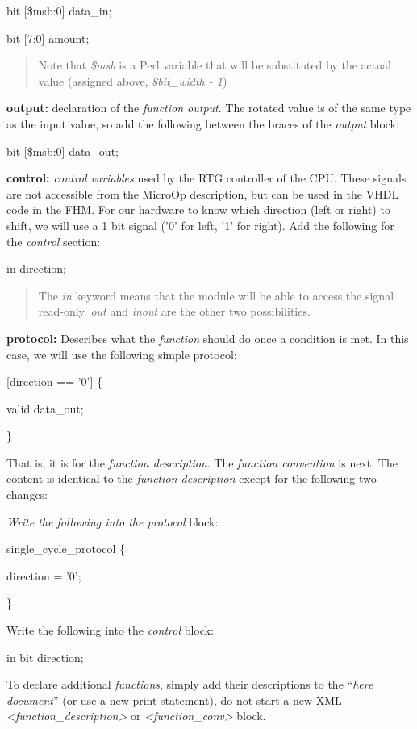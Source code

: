 \documentclass[
]{article}
\begin{document}
bit {[}\$msb:0{]} data\_in;

bit {[}7:0{]} amount;

\begin{quote}
Note that \emph{\$msb} is a Perl variable that will be substituted by
the actual value (assigned above, \emph{\$bit\_width - 1})
\end{quote}

\textbf{output:} declaration of the \emph{function output}. The rotated
value is of the same type as the input value, so add the following
between the braces of the \emph{output} block:

bit {[}\$msb:0{]} data\_out;

\textbf{control:} \emph{control variables} used by the RTG controller of
the CPU. These signals are not accessible from the MicroOp description,
but can be used in the VHDL code in the FHM. For our hardware to know
which direction (left or right) to shift, we will use a 1 bit signal
('0' for left, '1' for right). Add the following for the \emph{control}
section:

in direction;

\begin{quote}
The \emph{in} keyword means that the module will be able to access the
signal read-only. \emph{out} and \emph{inout} are the other two
possibilities.
\end{quote}

\textbf{protocol:} Describes what the \emph{function} should do once a
condition is met. In this case, we will use the following simple
protocol:

{[}direction == '0'{]} \{

valid data\_out;

\}

That is, it is for the \emph{function description}. The \emph{function
convention} is next. The content is identical to the \emph{function
description} except for the following two changes:

\emph{Write the following into the protocol} block:

single\_cycle\_protocol \{

direction = '0';

\}

Write the following into the \emph{control} block:

in bit direction;

To declare additional \emph{functions}, simply add their descriptions to
the ``\emph{here document}'' (or use a new print statement), do not
start a new XML \emph{\textless function\_description\textgreater{}} or
\emph{\textless function\_conv\textgreater{}} block.
\end{document}

